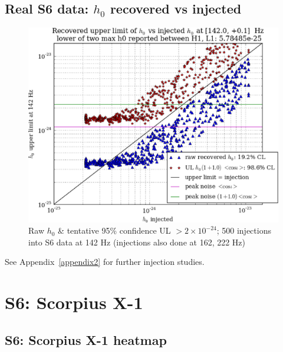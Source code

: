 \subsection{Real S6 data: $h_0$ recovered vs injected}

\begin{figure}
\begin{center}
\includegraphics[width=0.4\paperwidth,height=0.2\paperheight]{plots/h0UL-vs-h0injected-142-0Hz.eps}
\caption{
Raw $h_0$ \& tentative 95\% confidence UL $>2\times10^{-24}$; 500 injections
into S6 data at 142 Hz (injections also done at 162, 222 Hz)}
\end{center}
\end{figure}

See Appendix~\ref{appendix2} for further injection studies.

\section{S6: Scorpius X-1}

\subsection{S6: Scorpius X-1 heatmap}

